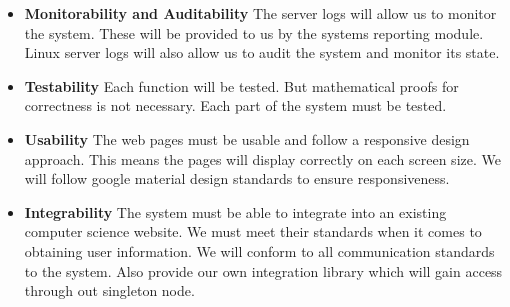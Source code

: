 \begin{itemize}
\begin{itemize}
		\end{itemize}
	\item \textbf{Monitorability and Auditability}
		The server logs will allow us to monitor the system. These will be provided to us by the systems reporting module. Linux server logs will also allow us to audit the system and monitor its state.
	\item \textbf{Testability}
		Each function will be tested. But mathematical proofs for correctness is not necessary. Each part of the system must be tested. 
	\item \textbf{Usability}
		The web pages must be usable and follow a responsive design approach. This means the pages will display correctly on each screen size. We will follow google material design standards to ensure responsiveness.
	\item \textbf{Integrability}
		The system must be able to integrate into an existing computer science website. We must meet their standards when it comes to obtaining user information. We will conform to all communication standards to the system. Also provide our own integration library which will gain access through out singleton node.
\end{itemize}

%